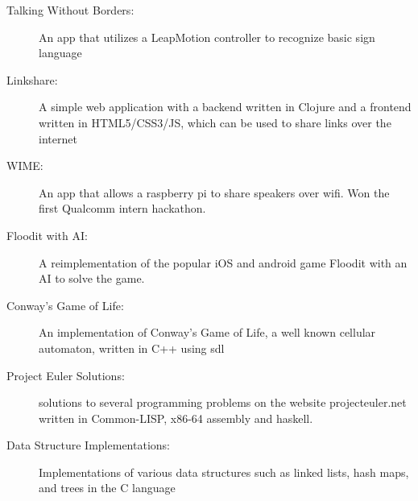 \documentclass[letterpaper,11pt]{article}
\newcommand{\resitem}[1]{\item #1 \vspace{-2pt}}
\begin{document}
\begin{description}
\resitem[ Talking Without Borders:]
  { \footnotesize An app that utilizes a LeapMotion controller to recognize
    basic sign language}
  \vspace{-3mm}

\resitem[ Linkshare:]
  { \footnotesize A simple web application with a backend written in Clojure and
  a frontend written in HTML5/CSS3/JS, which can be used to share links over the
  internet}
  \vspace{-3mm}

\resitem[ WIME:]
  { \footnotesize An app that allows a raspberry pi to share speakers over wifi. Won the first Qualcomm intern hackathon.}
  \vspace{-3mm}
  
\resitem[ Floodit with AI:]
  { \footnotesize A reimplementation of the popular
    iOS and android game Floodit with an AI to solve the game.}
  \vspace{-3mm}
  
\resitem[ Conway's Game of Life:]
  { \footnotesize An implementation of Conway's Game of
    Life, a well known cellular automaton, written in
    C++ using sdl
  }
  \vspace{-3mm}
  
\resitem[ Project Euler Solutions:]
  { \footnotesize solutions to several programming problems on the
    website projecteuler.net written in Common-LISP, x86-64 assembly and haskell.
  }
  \vspace{-3mm}
  
\resitem[ Data Structure Implementations:]
  { \footnotesize Implementations of various data structures
    such as linked lists, hash maps, and trees in the
    C language
  }


\end{description} %
\end{document}
